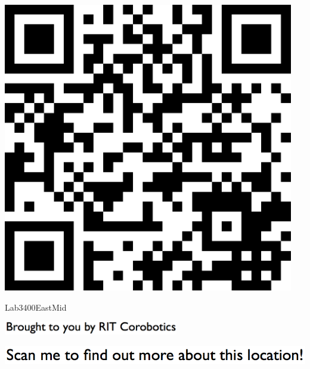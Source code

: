 \documentclass[letterpaper]{article}
\begin{document}
 \begingroup 
 \centerline{\includegraphics[scale=1,width=5in,height=5in]{Lab3400EastMid.png}} 
 \endgroup 
 \vspace*{\fill} 

 \hfill{\small Lab3400EastMid} 

  \vspace{0.7in} 
 
 \centerline{\includegraphics[scale=1,width=3in]{text-bottom.png}} 
 
 \pagebreak 
{} 
 \vspace*{\fill} 
 
  \centerline{\includegraphics[scale=1,width=6in]{text-top.png}} 
 
 \vspace{0.5in} 
 
\end{document}
